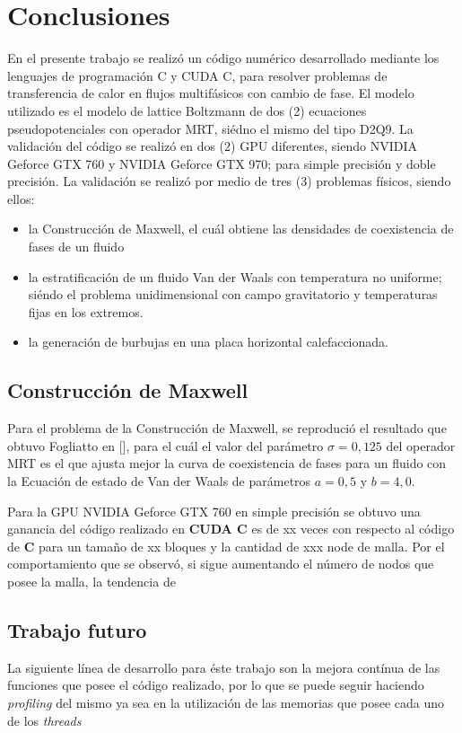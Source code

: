 \chapter{Conclusiones}
\graphicspath{{figs/cap4/}}
\label{cap5}

En el presente trabajo se realizó un código numérico desarrollado mediante los lenguajes de programación C y CUDA C, para resolver problemas de transferencia de calor en flujos multifásicos con cambio de fase.
El modelo utilizado es el modelo de lattice Boltzmann de dos (2) ecuaciones pseudopotenciales con operador MRT, siédno el mismo del tipo D2Q9.
La validación del código se realizó en dos (2) GPU diferentes, siendo NVIDIA Geforce GTX 760 y  NVIDIA Geforce GTX 970; para simple precisión y doble precisión.
La validación se realizó por medio de tres (3) problemas físicos, siendo ellos:

\begin{itemize}
    
    \item la Construcción de Maxwell, el cuál obtiene las densidades de coexistencia de fases de un fluido 

    \item la estratificación de un fluido Van der Waals con temperatura no uniforme; siéndo el problema unidimensional con campo gravitatorio y temperaturas fijas en los extremos.

    \item la generación de burbujas en una placa horizontal calefaccionada.

\end{itemize}

\section{Construcción de Maxwell}

Para el problema de la Construcción de Maxwell, se reprodució el resultado que obtuvo Fogliatto en [], para el cuál el valor del parámetro $\sigma = 0,125$ del operador MRT es el que ajusta mejor la curva de coexistencia de fases para un fluido con la Ecuación de estado de Van der Waals de parámetros $ a = 0,5 $ y $ b = 4,0 $. 

Para la GPU NVIDIA Geforce GTX 760 en simple precisión se obtuvo una ganancia del código realizado en \textbf{CUDA C} es de xx veces con respecto al código de \textbf{C} para un tamaño de xx bloques y la cantidad de xxx node de malla. Por el comportamiento que se observó, si sigue aumentando el número de nodos que posee la malla, la tendencia de 


\section{Trabajo futuro}

La siguiente línea de desarrollo para éste trabajo son la mejora contínua de las funciones que posee el código realizado, por lo que se puede seguir haciendo \textit{profiling} del mismo ya sea en la utilización de las memorias que posee cada uno de los \textit{threads} 
